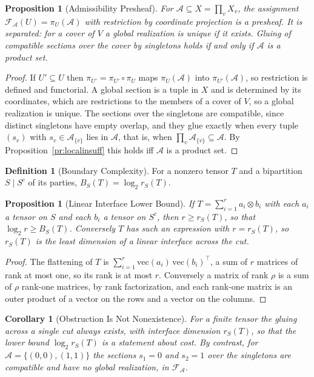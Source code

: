 \documentclass[11pt,letterpaper]{report}
\theoremstyle{plain}
\newtheorem{proposition}[theorem]{Proposition}
\newtheorem{corollary}[theorem]{Corollary}
\theoremstyle{definition}
\newtheorem{definition}[theorem]{Definition}
\theoremstyle{remark}
\begin{document}
\begin{proposition}[Admissibility Presheaf]\label{pr:admpresheaf}
For $\mathcal A\subseteq X=\prod_vX_v$, the assignment $\mathcal F_{\mathcal A}(U)=\pi_U(\mathcal A)$ with restriction by coordinate projection is a presheaf. It is separated: for a cover of $V$ a global realization is unique if it exists. Gluing of compatible sections over the cover by singletons holds if and only if $\mathcal A$ is a product set.
\end{proposition}
\begin{proof}
If $U'\subseteq U$ then $\pi_{U'}=\pi_{U'}\circ\pi_U$ maps $\pi_U(\mathcal A)$ into $\pi_{U'}(\mathcal A)$, so restriction is defined and functorial. A global section is a tuple in $X$ and is determined by its coordinates, which are restrictions to the members of a cover of $V$, so a global realization is unique. The sections over the singletons are compatible, since distinct singletons have empty overlap, and they glue exactly when every tuple $(s_v)$ with $s_v\in\mathcal A_{\{v\}}$ lies in $\mathcal A$, that is, when $\prod_v\mathcal A_{\{v\}}\subseteq\mathcal A$. By Proposition~\ref{pr:localinsuff} this holds iff $\mathcal A$ is a product set.
\end{proof}

\begin{definition}[Boundary Complexity]\label{def:boundarycomplexity}
For a nonzero tensor $T$ and a bipartition $S\mid S^c$ of its parties, $B_S(T)=\log_2r_S(T)$.
\end{definition}

\begin{proposition}[Linear Interface Lower Bound]\label{pr:interface}
If $T=\sum_{i=1}^ra_i\otimes b_i$ with each $a_i$ a tensor on $S$ and each $b_i$ a tensor on $S^c$, then $r\ge r_S(T)$, so that $\log_2r\ge B_S(T)$. Conversely $T$ has such an expression with $r=r_S(T)$, so $r_S(T)$ is the least dimension of a linear interface across the cut.
\end{proposition}
\begin{proof}
The flattening of $T$ is $\sum_{i=1}^r\mathrm{vec}(a_i)\,\mathrm{vec}(b_i)^{\top}$, a sum of $r$ matrices of rank at most one, so its rank is at most $r$. Conversely a matrix of rank $\rho$ is a sum of $\rho$ rank-one matrices, by rank factorization, and each rank-one matrix is an outer product of a vector on the rows and a vector on the columns.
\end{proof}

\begin{corollary}[Obstruction Is Not Nonexistence]\label{co:obstructnonexist}
For a finite tensor the gluing across a single cut always exists, with interface dimension $r_S(T)$, so that the lower bound $\log_2r_S(T)$ is a statement about cost. By contrast, for $\mathcal A=\{(0,0),(1,1)\}$ the sections $s_1=0$ and $s_2=1$ over the singletons are compatible and have no global realization, in $\mathcal F_{\mathcal A}$.
\end{corollary}
\end{document}
